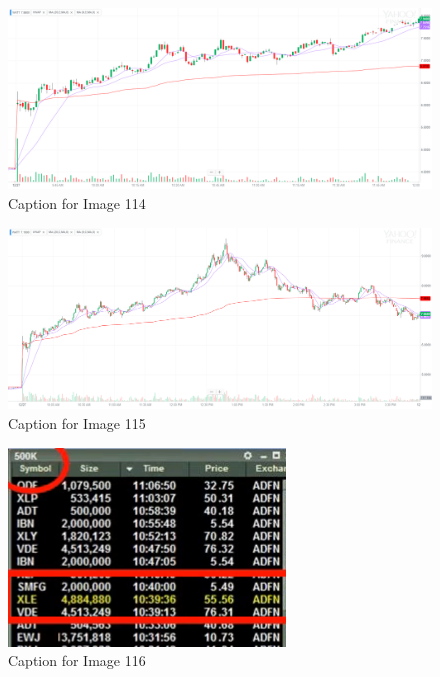 \documentclass{article}
\begin{document}
\vspace{10pt}

\begin{figure}[!htb]
    \centering
    \includegraphics[width=\textwidth]{imgs/114.png}
    \caption{Caption for Image 114}
\end{figure}

\vspace{10pt}

\begin{figure}[!htb]
    \centering
    \includegraphics[width=\textwidth]{imgs/115.png}
    \caption{Caption for Image 115}
\end{figure}

\vspace{10pt}

\begin{figure}[!htb]
    \centering
    \includegraphics[width=\textwidth]{imgs/116.png}
    \caption{Caption for Image 116}
\end{figure}
\end{document}
